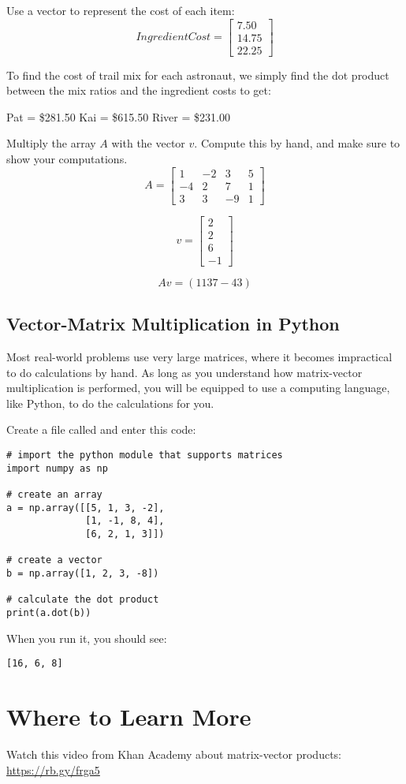 Use a vector to represent the cost of each item:
$$IngredientCost = 
\begin{bmatrix}
7.50 \\
14.75 \\
22.25
\end{bmatrix}$$

To find the cost of trail mix for each astronaut, we simply find the dot product between the mix ratios and the ingredient costs to get:

Pat =  \$281.50 \newline
Kai =  \$615.50 \newline
River = \$231.00 \newline


\begin{Exercise}[title={Vector Matrix Multiplication}, label=vector-matrix-multiply01]
Multiply the array $A$ with the vector $v$. Compute this by hand, and make sure to show your computations. 
$$A = \begin{bmatrix}
1 & -2 & 3 & 5  \\
-4 & 2 & 7 & 1 \\
3 & 3  & -9 & 1
\end{bmatrix}$$

$$v = 
\begin{bmatrix}
 2 \\
 2 \\
 6 \\
 -1
 \end{bmatrix}$$
\end{Exercise}

\begin{Answer}[ref=vector-matrix-multiply01]
$$Av = (11 37 -43)$$
\end{Answer}

\subsection{Vector-Matrix Multiplication in Python}
Most real-world problems use very large matrices, where it becomes impractical to do calculations by hand. As long as you understand how matrix-vector multiplication is performed, you will be equipped to use a computing language, like Python, to do the calculations for you. 

Create a file called  and enter this code:

\begin{Verbatim}
# import the python module that supports matrices
import numpy as np

# create an array
a = np.array([[5, 1, 3, -2], 
              [1, -1, 8, 4], 
              [6, 2, 1, 3]])

# create a vector 
b = np.array([1, 2, 3, -8])

# calculate the dot product
print(a.dot(b))
\end{Verbatim}

When you run it, you should see:
\begin{Verbatim}
[16, 6, 8]
\end{Verbatim}

\section{Where to Learn More}
Watch this video from Khan Academy about matrix-vector products: \url{https://rb.gy/frga5}

